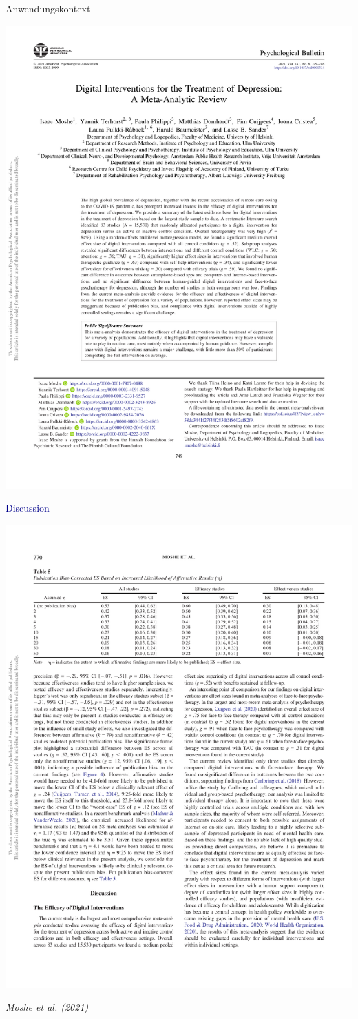 \documentclass[
  8pt,
  ignorenonframetext,
]{beamer}
\begin{document}
\begin{frame}[t]{Anwendungskontext}
\protect\hypertarget{anwendungskontext-5}{}
\begin{center}\includegraphics[width=0.7\linewidth]{8_Abbildungen/alm_8_review_title} \end{center}
\center

\textcolor{darkblue}{Discussion}

\begin{center}\includegraphics[width=0.5\linewidth]{8_Abbildungen/alm_8_review_discussion} \end{center}
\flushright
\footnotesize

\emph{Moshe et al. (2021)}
\end{frame}
\end{document}
